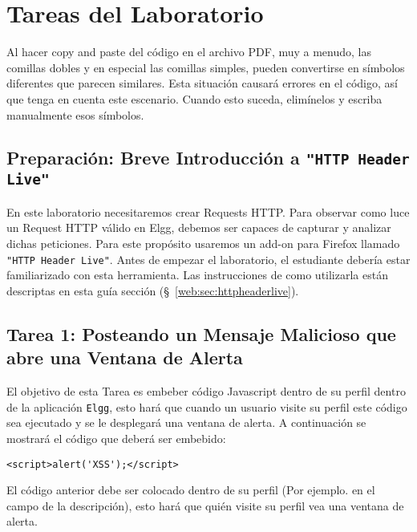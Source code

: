 \section{Tareas del Laboratorio}

Al hacer copy and paste del código en el archivo PDF, muy a menudo, las comillas dobles y en especial las comillas simples, pueden convertirse en símbolos diferentes que parecen similares. Esta situación causará errores en el código, así que tenga en cuenta este escenario. Cuando esto suceda, elimínelos y escriba manualmente esos símbolos.


\subsection{Preparación: Breve Introducción a \texttt{"HTTP Header Live"}}

En este laboratorio necesitaremos crear Requests HTTP. 
Para observar como luce un Request HTTP válido en Elgg, debemos ser capaces de capturar y analizar dichas peticiones.
Para este propósito usaremos un add-on para Firefox llamado \texttt{"HTTP Header Live"}. Antes de empezar el laboratorio, el estudiante debería estar familiarizado con esta herramienta.
Las instrucciones de como utilizarla están descriptas en esta guía sección (\S~\ref{web:sec:httpheaderlive}).



\subsection{Tarea 1: Posteando un Mensaje Malicioso que abre una Ventana de Alerta}

El objetivo de esta Tarea es embeber código Javascript dentro de su perfil dentro de la aplicación {\tt Elgg}, esto hará que cuando un usuario visite su perfil este código sea ejecutado y se le desplegará una ventana de alerta. 
A continuación se mostrará el código que deberá ser embebido:

\begin{lstlisting}
<script>alert('XSS');</script> 
\end{lstlisting}
El código anterior debe ser colocado dentro de su perfil (Por ejemplo. en el campo de la descripción), esto hará que quién visite su perfil vea una ventana de alerta.


